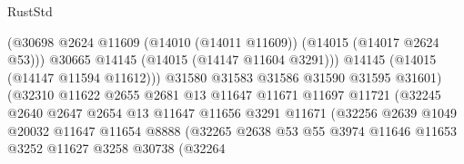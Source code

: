 \begin{lexlean}{RustStd}
\begin{coremodule}
                                          (@30698
                                            @2624
                                            @11609
                                            (@14010 (@14011 @11609))
                                            (@14015 (@14017 @2624 @53)))
                                          @30665
                                          @14145
                                          (@14015 (@14147 @11604 @3291)))
                                        @14145
                                        (@14015 (@14147 @11594 @11612)))
                                      @31580
                                      @31583
                                      @31586
                                      @31590
                                      @31595
                                      @31601)
                                    (@32310
                                      @11622
                                      @2655
                                      @2681
                                      @13
                                      @11647
                                      @11671
                                      @11697
                                      @11721
                                      (@32245
                                        @2640
                                        @2647
                                        @2654
                                        @13
                                        @11647
                                        @11656
                                        @3291
                                        @11671
                                        (@32256
                                          @2639
                                          @1049
                                          @20032
                                          @11647
                                          @11654
                                          @8888
                                          (@32265
                                            @2638
                                            @53
                                            @55
                                            @3974
                                            @11646
                                            @11653
                                            @3252
                                            @11627
                                            @3258
                                            @30738
                                            (@32264

\end{coremodule}
\end{lexlean}
